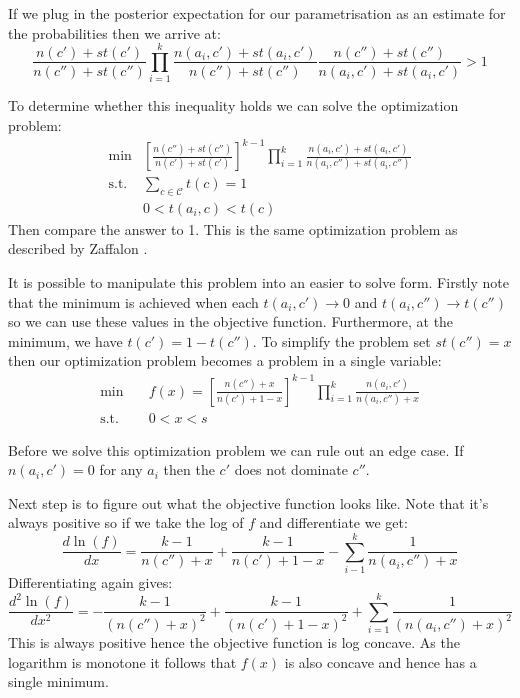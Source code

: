 If we plug in the posterior expectation for our parametrisation as an estimate for the probabilities then we arrive at:
\begin{equation}
	\frac{n(c')+st(c')}{n(c'')+st(c'')} \prod_{i=1}^k \frac{n(a_i, c') + st(a_i , c')}{n(c'') + st(c'')} \frac{n(c'') + st(c'')}{n(a_i, c') + st(a_i , c')} > 1
\end{equation}

To determine whether this inequality holds we can solve the optimization problem:
\begin{align}
	\min & \left[ \frac{n(c'')+st(c'')}{n(c')+st(c')} \right]^{k-1} \prod_{i=1}^k \frac{n(a_i, c') + st(a_i , c')}{n(a_i, c'') + st(a_i , c'')} \\
	\text{s.t.} & \sum_{c \in \mathcal{C}} t(c) = 1 \\
	& 0 < t(a_i, c) < t(c)
\end{align}
Then compare the answer to 1.
This is the same optimization problem as described by Zaffalon \cite{Zaffalon01}.

It is possible to manipulate this problem into an easier to solve form.
Firstly note that the minimum is achieved when each $t(a_i, c') \rightarrow 0$ and $t(a_i, c'') \rightarrow t(c'')$ so we can use these values in the objective function.
Furthermore, at the minimum, we have $t(c') = 1 - t(c'')$.
To simplify the problem set $st(c'') = x$ then our optimization problem becomes a problem in a single variable:
\begin{align}
	\min \quad & f(x) = \left[ \frac{n(c'') + x}{n(c') + 1 - x} \right]^{k-1} \prod_{i=1}^k \frac{n(a_i, c')}{n(a_i, c'') + x} \\
	\text{s.t.} \quad & 0 < x < s
\end{align}

Before we solve this optimization problem we can rule out an edge case.
If $n(a_i, c')=0$ for any $a_i$ then the $c'$ does not dominate $c''$.

Next step is to figure out what the objective function looks like.
Note that it's always positive so if we take the log of $f$ and differentiate we get:
\begin{equation}
	\frac{d\ln(f)}{dx} = \frac{k-1}{n(c'')+x} + \frac{k-1}{n(c')+1-x} - \sum_{i-1}^k \frac{1}{n(a_i, c'') + x}
\end{equation}
Differentiating again gives:
\begin{equation}
	\frac{d^2\ln(f)}{dx^2} = -\frac{k-1}{(n(c'') + x)^2} + \frac{k-1}{(n(c')+1-x)^2} + \sum_{i=1}^k \frac{1}{(n(a_i, c'') + x)^2}
\end{equation}
This is always positive hence the objective function is log concave.
As the logarithm is monotone it follows that $f(x)$ is also concave and hence has a single minimum.


